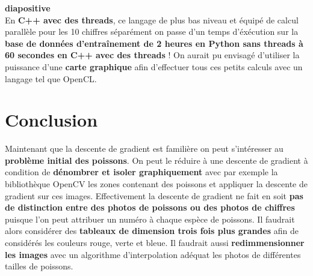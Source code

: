 \documentclass{article}
\begin{document}
	\textbf{diapositive}\\
	
	En \textbf{C++ avec des threads}, ce langage de plus bas niveau et équipé de calcul parallèle pour les 10 chiffres séparément on passe d'un temps d'éxécution sur la \textbf{base de données d'entraînement de 2 heures en Python sans threads à 60 secondes en C++ avec des threads} ! On aurait pu envisagé d'utiliser la puissance d'une \textbf{carte graphique} afin d'effectuer tous ces petits calculs avec un langage tel que OpenCL.
	
	\section{Conclusion}
	
		Maintenant que la descente de gradient est familière on peut s'intéresser au \textbf{problème initial des poissons}. On peut le réduire à une descente de gradient à condition de \textbf{dénombrer et isoler graphiquement} avec par exemple la bibliothèque OpenCV les zones contenant des poissons et appliquer la descente de gradient sur ces images. Effectivement la descente de gradient ne fait en soit \textbf{pas de distinction entre des photos de poissons ou des photos de chiffres} puisque l'on peut attribuer un numéro à chaque espèce de poissons. Il faudrait alors considérer des \textbf{tableaux de dimension trois fois plus grandes} afin de considérés les couleurs rouge, verte et bleue. Il faudrait aussi \textbf{redimmensionner les images} avec un algorithme d'interpolation adéquat les photos de différentes tailles de poissons.
	
	
\end{document}
